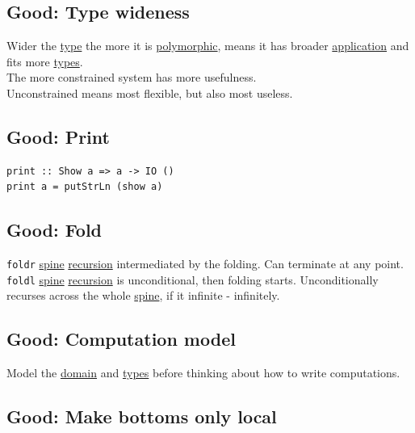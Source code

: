 \documentclass[11pt]{article}
\begin{document}
\subsection{\label{org7d6afe1}Good: Type wideness}
\label{sec:org323ef01}
Wider the \hyperref[org4fbaeb8]{type} the more it is \hyperref[org84d7fee]{polymorphic}, means it has broader \hyperref[orged2f814]{application} and fits more \hyperref[org3927fd9]{types}.\\

The more constrained system has more usefulness.\\

Unconstrained means most flexible, but also most useless.\\

\subsection{\label{org0ac2276}Good: Print}
\label{sec:orgfe19edf}
\begin{verbatim}
print :: Show a => a -> IO ()
print a = putStrLn (show a)
\end{verbatim}

\subsection{\label{org75c9e7d}Good: Fold}
\label{sec:orgd4b36c0}
\texttt{foldr} \hyperref[orgfd4e089]{spine} \hyperref[orgc27dbaf]{recursion} intermediated by the folding. Can terminate at any point.\\
\texttt{foldl} \hyperref[orgfd4e089]{spine} \hyperref[orgc27dbaf]{recursion} is unconditional, then folding starts. Unconditionally recurses across the whole \hyperref[orgfd4e089]{spine}, if it infinite - infinitely.\\

\subsection{\label{org0fdb2c1}Good: Computation model}
\label{sec:org28d0c01}
Model the \hyperref[orgf784585]{domain} and \hyperref[org3927fd9]{types} before thinking about how to write computations.\\

\subsection{\label{org08c9c19}Good: Make bottoms only local}
\label{sec:orga8e6ffd}
\end{document}
